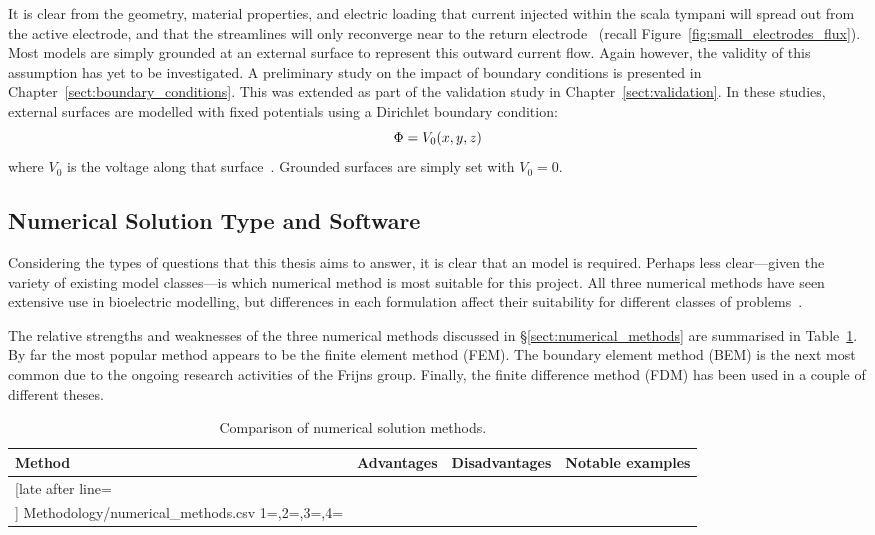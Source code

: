 It is clear from the geometry, material properties, and electric loading that
current injected within the scala tympani will spread out from the active
electrode, and that the streamlines will only reconverge near to the return
electrode~\cite{baker1989} (recall Figure~\ref{fig:small_electrodes_flux}). Most
models are simply grounded at an external surface to represent this outward
current flow. Again however, the validity of this assumption has yet to be
investigated. A preliminary study on the impact of boundary conditions is
presented in Chapter~\ref{sect:boundary_conditions}. This was extended as part
of the validation study in Chapter~\ref{sect:validation}. In these studies,
external surfaces are modelled with fixed potentials using a Dirichlet boundary
condition:
\begin{equation}
	\centering
	\Phi = V_0 (x,y,z)
\end{equation}
where $ V_0 $ is the voltage along that surface~\cite{miller1990}. Grounded
surfaces are simply set with $ V_0 = 0 $.

\subsection{Numerical Solution Type and Software}

Considering the types of questions that this thesis aims to answer, it is clear
that an \insilico{} model is required. Perhaps less clear---given the variety of
existing model classes---is which numerical method is most suitable for this
project. All three numerical methods have seen extensive use in bioelectric
modelling, but differences in each formulation affect their suitability for
different classes of
problems~\cite{cendes1989,miller1990,schimpf1998,bondeson2005,johnson2006}.

The relative strengths and weaknesses of the three numerical methods discussed
in \S\ref{sect:numerical_methods} are summarised in
Table~\ref{table:numerical_methods}. By far the most popular method appears to
be the finite element method (FEM). The boundary element method (BEM) is the
next most common due to the ongoing research activities of the Frijns group.
Finally, the finite difference method (FDM) has been used in a couple of
different theses.

\begin{table}
	\centering
	\sffamily
	\small
	\caption[Comparison of numerical solution methods]{Comparison of numerical
	solution methods.}
	\label{table:numerical_methods}

	\begin{tabularx}{\textwidth}{X p{4.1cm} p{4.1cm} p{4.4cm}}
		\toprule
		\textbf{Method}	& \textbf{Advantages}	& \textbf{Disadvantages} &
			\textbf{Notable examples} \\
		\midrule
		
		\csvreader[late after line=\\]%
			{Methodology/numerical_methods.csv}%
			{1=\method,2=\adv,3=\disadv,4=\egs}%
 			{\method & \adv & \disadv & \egs}%
		\bottomrule
	\end{tabularx}

\end{table}

